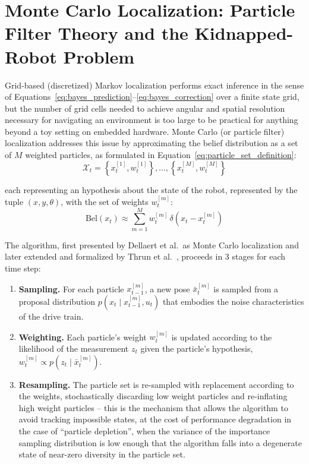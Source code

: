 \section{Monte Carlo Localization: Particle Filter Theory and the Kidnapped-Robot Problem}
\label{sec:mcl_theory}

Grid-based (discretized) Markov localization performs exact inference in the sense of Equations~\eqref{eq:bayes_prediction}--\eqref{eq:bayes_correction} over a finite state grid, but the number of grid cells needed to achieve angular and spatial resolution necessary for navigating an environment is too large to be practical for anything beyond a toy setting on embedded hardware. Monte Carlo (or particle filter) localization addresses this issue by approximating the belief distribution as a set of $M$ weighted particles, as formulated in Equation~\eqref{eq:particle_set_definition}:
\begin{equation}
\mathcal{X}_t = \left\{ x_t^{[1]}, w_t^{[1]} \right\}, \dots, \left\{ x_t^{[M]}, w_t^{[M]} \right\} \label{eq:particle_set_definition}
\end{equation}

each representing an hypothesis about the state of the robot, represented by the tuple $(x, y, \theta)$, with the set of weights $w_t^{[m]}$:
\begin{equation}
\mathrm{Bel}(x_t) \approx \sum_{m=1}^{M} w_t^{[m]} \, \delta\!\left(x_t - x_t^{[m]}\right) \label{eq:particle_belief_approximation}
\end{equation}

The algorithm, first presented by Dellaert et al.\ as Monte Carlo localization \cite{dellaert1999monte} and later extended and formalized by Thrun et al.\ \cite{thrun2001robust}, proceeds in 3 stages for each time step:

\begin{enumerate}
    \item \textbf{Sampling.} For each particle $x_{t-1}^{[m]}$, a new pose $\bar{x}_t^{[m]}$ is sampled from a proposal distribution $p(x_t \mid x_{t-1}^{[m]}, u_t)$ that embodies the noise characteristics of the drive train.
    \item \textbf{Weighting.} Each particle's weight $w_t^{[m]}$ is updated according to the likelihood of the measurement $z_t$ given the particle's hypothesis, $w_t^{[m]} \propto p(z_t \mid \bar{x}_t^{[m]})$.
    \item \textbf{Resampling.} The particle set is re-sampled with replacement according to the weights, stochastically discarding low weight particles and re-inflating high weight particles -- this is the mechanism that allows the algorithm to avoid tracking impossible states, at the cost of performance degradation in the case of ``particle depletion'', when the variance of the importance sampling distribution is low enough that the algorithm falls into a degenerate state of near-zero diversity in the particle set.
\end{enumerate}

